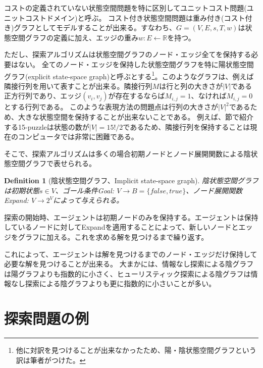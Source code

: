 \documentclass{report}
\newtheorem{definition}{Definition}
\begin{document}
コストの定義されていない状態空間問題を特に区別してユニットコスト問題(ユニットコストドメイン)と呼ぶ。
コスト付き状態空間問題は重み付き(コスト付き)グラフとしてモデルすることが出来る。すなわち、$G = (V, E, s, T, w)$は状態空間グラフの定義に加え、エッジの重み$w: E \leftarrow \mathbb{R}$を持つ。


ただし、探索アルゴリズムは状態空間グラフのノード・エッジ全てを保持する必要はない。
全てのノード・エッジを保持した状態空間グラフを特に陽状態空間グラフ(explicit state-space graph)と呼ぶとする\footnote{他に対訳を見つけることが出来なかったため、陽・陰状態空間グラフという訳は筆者がつけた。}。このようなグラフは、例えば隣接行列を用いて表すことが出来る。隣接行列$M$は行と列の大きさが$|V|$である正方行列であり、エッジ$(v_i, v_j)$が存在するならば$M_{i,j}=1$、なければ$M_{i,j}=0$とする行列である。
このような表現方法の問題点は行列の大きさが$|V|^2$であるため、大きな状態空間を保持することが出来ないことである。
例えば、節で紹介する15-puzzleは状態の数が$|V|=15!/2$であるため、隣接行列を保持することは現在のコンピュータでは非常に困難である。

そこで、探索アルゴリズムは多くの場合初期ノードとノード展開関数による陰状態空間グラフで表せられる。

\begin{definition}[陰状態空間グラフ、Implicit state-space graph]
陰状態空間グラフは初期状態$s \in V$、ゴール条件Goal: $V \rightarrow B = \{false, true\}$、ノード展開関数Expand: $V \rightarrow 2^V$によって与えられる。
\end{definition}

探索の開始時、エージェントは初期ノードのみを保持する。エージェントは保持しているノードに対してExpandを適用することによって、新しいノードとエッジをグラフに加える。これを求める解を見つけるまで繰り返す。



これによって、エージェントは解を見つけるまでのノード・エッジだけ保持して必要な解を見つけることが出来る。
大まかには、情報なし探索による陰グラフは陽グラフよりも指数的に小さく、ヒューリスティック探索による陰グラフは情報なし探索による陰グラフよりも更に指数的に小さいことが多い。


\section{探索問題の例}
\label{sec:search-problem}
\end{document}
